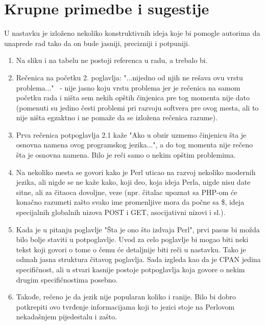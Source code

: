 \documentclass[a4paper]{report}
\begin{document}
\section{Krupne primedbe i sugestije}
U nastavku je izloženo nekoliko konstruktivnih ideja koje bi pomogle autorima da unaprede rad tako da on bude jasniji, precizniji i potpuniji.
\begin{enumerate}
\item Na sliku i na tabelu ne postoji referenca u radu, a trebalo bi.
\item Rečenica na početku 2. poglavlja: "...nijedno od njih ne rešava ovu vrstu problema..." \ - nije jasno koju vrstu problema jer je rečenica na samom početku rada i ništa sem nekih opštih činjenica pre tog momenta nije dato (pomenuti su jedino česti problemi pri razvoju softvera pre ovog mesta, ali to nije ništa egzaktno i ne pomaže da se izložena rečenica razume).
\item Prva rečenica potpoglavlja 2.1 kaže "Ako u obzir uzmemo činjenicu šta je osnovna namena ovog programskog jezika...", a do tog momenta nije rečeno šta je osnovna namena. Bilo je reči samo o nekim opštim problemima.
\item Na nekoliko mesta se govori kako je Perl uticao na razvoj nekoliko modernih jezika, ali nigde se ne kaže kako, koji deo, koja ideja Perla, nigde nisu date sitne, ali za čitaoca dovoljne, veze (npr. čitalac upoznat sa PHP-om će konačno razumeti zašto svako ime promenljive mora da počne sa \$, ideja specijalnih globalnih nizova POST i GET, asocijativni nizovi i sl.).
\item Kada je u pitanju poglavlje "Šta je ono što izdvaja Perl", prvi pasus bi možda bilo bolje staviti u potpoglavlje. Uvod za celo poglavlje bi mogao biti neki tekst koji govori o tome o čemu će detaljnije biti reči u nastavku. Tako je odmah jasna struktura čitavog poglavlja. Sada izgleda kao da je CPAN jedina specifičnost, ali u stvari kasnije postoje potpoglavlja koja govore o nekim drugim specifičnostima posebno. 
\item Takođe, rečeno je da jezik nije popularan koliko i ranije. Bilo bi dobro potkrepiti ovo tvrđenje  informacijama koji to jezici stoje na Perlovom nekadašnjem pijedestalu i zašto.
\end{enumerate}
\end{document}

